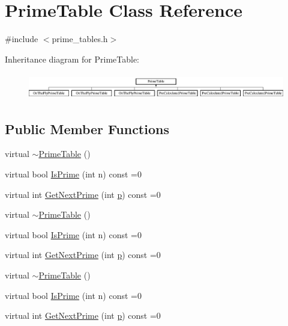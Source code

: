 \hypertarget{class_prime_table}{}\section{Prime\+Table Class Reference}
\label{class_prime_table}


{\ttfamily \#include $<$prime\+\_\+tables.\+h$>$}

Inheritance diagram for Prime\+Table\+:\begin{figure}[H]
\begin{center}
\leavevmode
\includegraphics[height=1.145194cm]{d6/d8b/class_prime_table}
\end{center}
\end{figure}
\subsection*{Public Member Functions}
\begin{DoxyCompactItemize}
\item 
virtual \mbox{\hyperlink{class_prime_table_af2cdea4896fd86a42b4dfd5e5027d640}{$\sim$\+Prime\+Table}} ()
\item 
virtual bool \mbox{\hyperlink{class_prime_table_a2ab9243364ded0c51541f641b2df362a}{Is\+Prime}} (int n) const =0
\item 
virtual int \mbox{\hyperlink{class_prime_table_ae537c939f56617d8937d57bbbae3ab30}{Get\+Next\+Prime}} (int \mbox{\hyperlink{_obj__test_2lib_2googletest-master_2googlemock_2test_2gmock-matchers__test_8cc_a6bc6b007533335efe02bafff799ec64c}{p}}) const =0
\item 
virtual \mbox{\hyperlink{class_prime_table_af2cdea4896fd86a42b4dfd5e5027d640}{$\sim$\+Prime\+Table}} ()
\item 
virtual bool \mbox{\hyperlink{class_prime_table_a2ab9243364ded0c51541f641b2df362a}{Is\+Prime}} (int n) const =0
\item 
virtual int \mbox{\hyperlink{class_prime_table_ae537c939f56617d8937d57bbbae3ab30}{Get\+Next\+Prime}} (int \mbox{\hyperlink{_obj__test_2lib_2googletest-master_2googlemock_2test_2gmock-matchers__test_8cc_a6bc6b007533335efe02bafff799ec64c}{p}}) const =0
\item 
virtual \mbox{\hyperlink{class_prime_table_af2cdea4896fd86a42b4dfd5e5027d640}{$\sim$\+Prime\+Table}} ()
\item 
virtual bool \mbox{\hyperlink{class_prime_table_a2ab9243364ded0c51541f641b2df362a}{Is\+Prime}} (int n) const =0
\item 
virtual int \mbox{\hyperlink{class_prime_table_ae537c939f56617d8937d57bbbae3ab30}{Get\+Next\+Prime}} (int \mbox{\hyperlink{_obj__test_2lib_2googletest-master_2googlemock_2test_2gmock-matchers__test_8cc_a6bc6b007533335efe02bafff799ec64c}{p}}) const =0
\end{DoxyCompactItemize}


